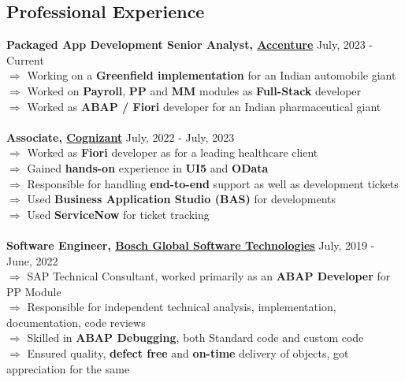 \documentclass[margin, centered, a4paper]{res}
\begin{document}
\begin{resume}

\section{Professional Experience}
\textbf{Packaged App Development Senior Analyst, \href{https://www.linkedin.com/company/accentureindia/}{Accenture}} \hfill{July, 2023 - Current}\\
$\Rightarrow$ Working on a \textbf{Greenfield implementation} for an Indian automobile giant\\
$\Rightarrow$ Worked on \textbf{Payroll}, \textbf{PP} and \textbf{MM} modules as \textbf{Full-Stack} developer\\
$\Rightarrow$ Worked as \textbf{ABAP / Fiori} developer for an Indian pharmaceutical giant\\
\\
\textbf{Associate, \href{https://www.linkedin.com/company/cognizant}{Cognizant}} \hfill{July, 2022 - July, 2023}\\
$\Rightarrow$ Worked as \textbf{Fiori} developer as for a leading healthcare client\\
$\Rightarrow$ Gained \textbf{hands-on} experience in \textbf{UI5} and \textbf{OData}\\
$\Rightarrow$ Responsible for handling \textbf{end-to-end} support as well as development tickets\\
$\Rightarrow$ Used \textbf{Business Application Studio (BAS)} for developments\\
$\Rightarrow$ Used \textbf{ServiceNow} for ticket tracking\\
\\
\textbf{Software Engineer, \href{https://www.linkedin.com/company/bosch-global-software-technologies/}{Bosch Global Software Technologies}} \hfill{July, 2019 - June, 2022}\\
$\Rightarrow$ SAP Technical Consultant, worked primarily as an \textbf{ABAP Developer} for PP Module\\
$\Rightarrow$ Responsible for independent technical analysis, implementation, documentation, code reviews\\
$\Rightarrow$ Skilled in \textbf{ABAP Debugging}, both Standard code and custom code\\
$\Rightarrow$ Ensured quality, \textbf{defect free} and \textbf{on-time} delivery of objects, got appreciation for the same\\

\end{resume}
\end{document}
